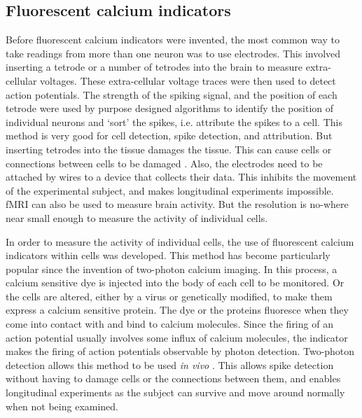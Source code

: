 \documentclass[a4paper,12pt]{article}
\theoremstyle{definition}
\begin{document}
\subsection{Fluorescent calcium indicators}
	Before fluorescent calcium indicators were invented, the most common way to take readings from more than one neuron was to use electrodes. This involved inserting a tetrode or a number of tetrodes into the brain to measure extra-cellular voltages. These extra-cellular voltage traces were then used to detect action potentials. The strength of the spiking signal, and the position of each tetrode were used by purpose designed algorithms to identify the position of individual neurons and `sort' the spikes, i.e. attribute the spikes to a cell. This method is very good for cell detection, spike detection, and attribution. But inserting tetrodes into the tissue damages the tissue. This can cause cells or connections between cells to be damaged \cite{buzsaki}. Also, the electrodes need to be attached by wires to a device that collects their data. This inhibits the movement of the experimental subject, and makes longitudinal experiments impossible. fMRI can also be used to measure brain activity. But the resolution is no-where near small enough to measure the activity of individual cells.
	
	In order to measure the activity of individual cells, the use of fluorescent calcium indicators within cells was developed. This method has become particularly popular since the invention of two-photon calcium imaging. In this process, a calcium sensitive dye is injected into the body of each cell to be monitored. Or the cells are altered, either by a virus or genetically modified, to make them express a calcium sensitive protein. The dye or the proteins fluoresce when they come into contact with and bind to calcium molecules. Since the firing of an action potential usually involves some influx of calcium molecules, the indicator makes the firing of action potentials observable by photon detection. Two-photon detection allows this method to be used \textit{in vivo} \cite{stosiek}. This allows spike detection without having to damage cells or the connections between them, and enables longitudinal experiments as the subject can survive and move around normally when not being examined. 
	
\end{document}
